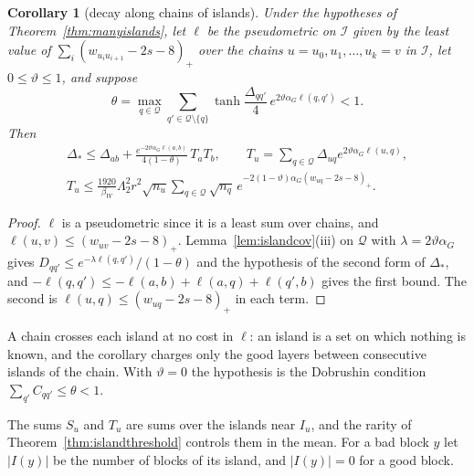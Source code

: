 \documentclass[11pt]{amsart}
\newtheorem{corollary}[theorem]{Corollary}
\theoremstyle{definition}
\theoremstyle{remark}
\numberwithin{equation}{section}
\begin{document}
\begin{corollary}[decay along chains of islands]\label{cor:islandchains}
Under the hypotheses of Theorem~\ref{thm:manyislands}, let $\ell$ be the
pseudometric on $\mathcal I$ given by the least value of $\sum_i(w_{u_iu_{i+1}}
-2s-8)_+$ over the chains $u=u_0,u_1,\dots,u_k=v$ in $\mathcal I$, let
$0\le\vartheta\le1$, and suppose
\[
\theta=\max_{q\in\mathcal Q}\sum_{q'\in\mathcal Q\setminus\{q\}}\tanh
\frac{\varDelta_{qq'}}4\,e^{2\vartheta\alpha_G\ell(q,q')}<1 .
\]
Then
\[
\begin{gathered}
\varDelta_*\le\varDelta_{ab}+\frac{e^{-2\vartheta\alpha_G\ell(a,b)}}
{4(1-\theta)}\,T_aT_b ,\qquad T_u=\sum_{q\in\mathcal Q}\varDelta_{uq}
e^{2\vartheta\alpha_G\ell(u,q)},\\
T_u\le\frac{1920}{\beta_W}\Lambda_2^2r^2\sqrt{n_u}\sum_{q\in\mathcal Q}
\sqrt{n_q}\,e^{-2(1-\vartheta)\alpha_G(w_{uq}-2s-8)_+}.
\end{gathered}
\]
\end{corollary}

\begin{proof}
$\ell$ is a pseudometric since it is a least sum over chains, and
$\ell(u,v)\le(w_{uv}-2s-8)_+$. Lemma~\ref{lem:islandcov}(iii) on $\mathcal Q$
with $\lambda=2\vartheta\alpha_G$ gives $D_{qq'}\le e^{-\lambda\ell(q,q')}
/(1-\theta)$ and the hypothesis of the second form of $\varDelta_*$, and
$-\ell(q,q')\le-\ell(a,b)+\ell(a,q)+\ell(q',b)$ gives the first bound. The
second is $\ell(u,q)\le(w_{uq}-2s-8)_+$ in each term.
\end{proof}

A chain crosses each island at no cost in $\ell$: an island is a set on
which nothing is known, and the corollary charges only the good layers
between consecutive islands of the chain. With $\vartheta=0$ the
hypothesis is the Dobrushin condition $\sum_{q'}C_{qq'}\le\theta<1$.

The sums $S_u$ and $T_u$ are sums over the islands near $I_u$, and the
rarity of Theorem~\ref{thm:islandthreshold} controls them in the mean. For
a bad block $y$ let $\lvert I(y)\rvert$ be the number of blocks of its
island, and $\lvert I(y)\rvert=0$ for a good block.
\end{document}
